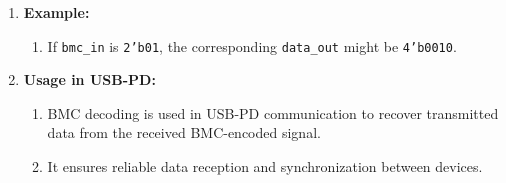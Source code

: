 \begin{enumerate}
    \item \textbf{Example:}
    \begin{enumerate}
        \item If \texttt{bmc\_in} is \texttt{2'b01}, the corresponding \texttt{data\_out} might be \texttt{4'b0010}.
    \end{enumerate}

    \item \textbf{Usage in USB-PD:}
    \begin{enumerate}
        \item BMC decoding is used in USB-PD communication to recover transmitted data from the received BMC-encoded signal.
        \item It ensures reliable data reception and synchronization between devices.
    \end{enumerate}
\end{enumerate}

